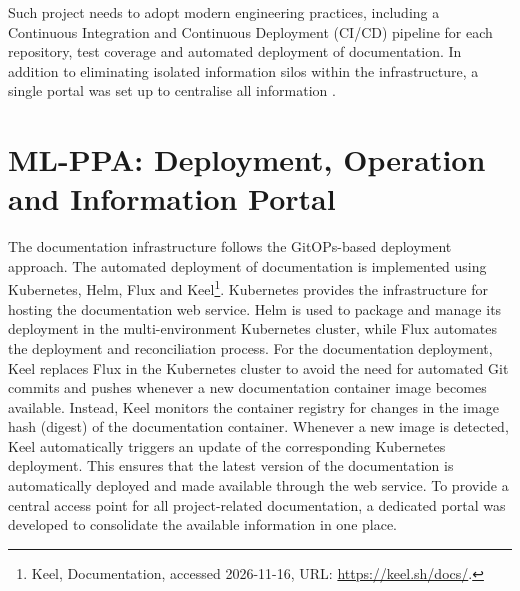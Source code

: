 \documentclass[11pt,twoside]{article}
\begin{document}

Such project needs to adopt modern engineering practices, including a Continuous Integration and Continuous Deployment (CI/CD) pipeline for each repository, test coverage and automated deployment of documentation. 
In addition to eliminating isolated information silos within the infrastructure, a single portal was set up to centralise all information \citep{ML-PPA_portal}.

\section{ML-PPA: Deployment, Operation and Information Portal}
The documentation infrastructure follows the GitOPs-based deployment approach. The automated deployment of documentation is implemented using Kubernetes, Helm, Flux and Keel\footnote{Keel, Documentation, accessed 2026-11-16, URL: \url{https://keel.sh/docs/}.}. Kubernetes provides the infrastructure for hosting the documentation web service. Helm is used to package and manage its deployment in the multi-environment Kubernetes cluster, while Flux automates the deployment and reconciliation process. For the documentation deployment, Keel replaces Flux  in the Kubernetes cluster to avoid the need for automated Git commits and pushes whenever a new documentation container image becomes available. Instead, Keel monitors the container registry for changes in the image hash (digest) of the documentation container. Whenever a new image is detected, Keel automatically triggers an update of the corresponding Kubernetes deployment. This ensures that the latest version of the documentation is automatically deployed and made available through the web service.
To provide a central access point for all project-related documentation, a dedicated portal was developed to consolidate the available information in one place.


\end{document}
